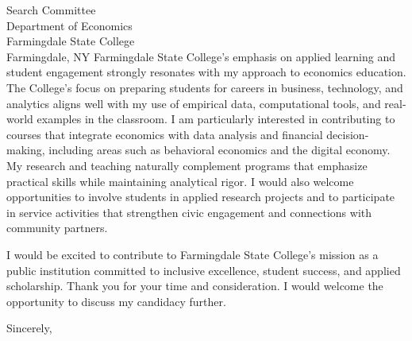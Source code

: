 \documentclass[11pt,letterpaper]{letter}
\begin{document}
\begin{letter}{Search Committee \\
Department of Economics \\
Farmingdale State College \\
Farmingdale, NY}
Farmingdale State College’s emphasis on applied learning and student engagement strongly resonates with my approach to economics education. The College’s focus on preparing students for careers in business, technology, and analytics aligns well with my use of empirical data, computational tools, and real-world examples in the classroom. I am particularly interested in contributing to courses that integrate economics with data analysis and financial decision-making, including areas such as behavioral economics and the digital economy. My research and teaching naturally complement programs that emphasize practical skills while maintaining analytical rigor. I would also welcome opportunities to involve students in applied research projects and to participate in service activities that strengthen civic engagement and connections with community partners.

I would be excited to contribute to Farmingdale State College’s mission as a public institution committed to inclusive excellence, student success, and applied scholarship. Thank you for your time and consideration. I would welcome the opportunity to discuss my candidacy further.

\closing{Sincerely,}

\end{letter}
\end{document}
